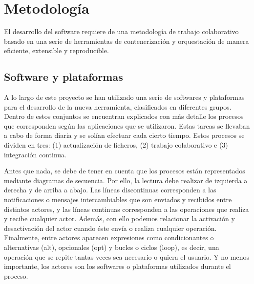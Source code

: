 

\chapter{Metodología}\label{chap:metod}
El desarrollo del software requiere de una metodología de trabajo colaborativo basado en una serie de herramientas de contenerización y orquestación de manera eficiente, extensible y reproducible.

\section{Software y plataformas}
A lo largo de este proyecto se han utilizado una serie de softwares y plataformas para el desarrollo de la nueva herramienta, clasificados en diferentes grupos. Dentro de estos conjuntos se encuentran explicados con más detalle los procesos que corresponden según las aplicaciones que se utilizaron.  Estas tareas se llevaban a cabo de forma diaria y se solían efectuar cada cierto tiempo. Estos procesos se dividen en tres: (1) actualización de ficheros, (2) trabajo colaborativo e (3) integración continua.

Antes que nada, se debe de tener en cuenta que los procesos están representados mediante diagramas de secuencia. Por ello, la lectura debe realizar de izquierda a derecha y de arriba a abajo. Las líneas discontinuas corresponden a las notificaciones o mensajes intercambiables que son enviados y recibidos entre distintos actores, y las líneas continuas corresponden a las operaciones que realiza y recibe cualquier actor. Además, con ello podemos relacionar la activación y desactivación del actor cuando éste envía o realiza cualquier operación. Finalmente, entre actores aparecen expresiones como condicionantes o alternativas (alt), opcionales (opt) y bucles o ciclos (loop), es decir, una operación que se repite tantas veces sea necesario o quiera el usuario. Y no menos importante, los actores son los softwares o plataformas utilizados durante el proceso.

